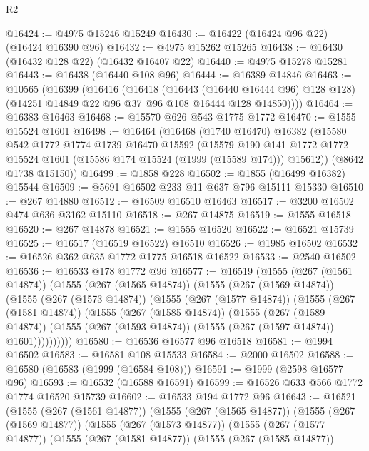 \begin{lexlean}{R2}
\begin{coremodule}
@16424 := @4975 @15246 @15249
@16430 := @16422 (@16424 @96 @22) (@16424 @16390 @96)
@16432 := @4975 @15262 @15265
@16438 := @16430 (@16432 @128 @22) (@16432 @16407 @22)
@16440 := @4975 @15278 @15281
@16443 := @16438 (@16440 @108 @96)
@16444 := @16389 @14846
@16463 := @10565
    (@16399
      (@16416
        (@16418
          (@16443 (@16440 @16444 @96) @128 @128)
          (@14251 @14849 @22 @96 @37 @96 @108 @16444 @128 @14850))))
@16464 := @16383 @16463
@16468 := @15570 @626 @543 @1775 @1772
@16470 := @1555 @15524 @1601
@16498 := @16464
    (@16468
      (@1740 @16470)
      @16382
      (@15580
        @542
        @1772
        @1774
        @1739
        @16470
        @15592
        (@15579
          @190
          @141
          @1772
          @1772
          @15524
          @1601
          (@15586 @174 @15524 (@1999 (@15589 @174)))
          @15612))
      (@8642 @1738 @15150))
@16499 := @1858 @228
@16502 := @1855 (@16499 @16382) @15544
@16509 := @5691 @16502 @233 @11 @637 @796 @15111 @15330
@16510 := @267 @14880
@16512 := @16509 @16510 @16463
@16517 := @3200 @16502 @474 @636 @3162 @15110
@16518 := @267 @14875
@16519 := @1555 @16518
@16520 := @267 @14878
@16521 := @1555 @16520
@16522 := @16521 @15739
@16525 := @16517 (@16519 @16522) @16510
@16526 := @1985 @16502
@16532 := @16526 @362 @635 @1772 @1775 @16518 @16522
@16533 := @2540 @16502
@16536 := @16533 @178 @1772 @96
@16577 := @16519
    (@1555
      (@267 (@1561 @14874))
      (@1555
        (@267 (@1565 @14874))
        (@1555
          (@267 (@1569 @14874))
          (@1555
            (@267 (@1573 @14874))
            (@1555
              (@267 (@1577 @14874))
              (@1555
                (@267 (@1581 @14874))
                (@1555
                  (@267 (@1585 @14874))
                  (@1555
                    (@267 (@1589 @14874))
                    (@1555 (@267 (@1593 @14874)) (@1555 (@267 (@1597 @14874)) @1601))))))))))
@16580 := @16536 @16577 @96 @16518
@16581 := @1994 @16502
@16583 := @16581 @108 @15533
@16584 := @2000 @16502
@16588 := @16580 (@16583 (@1999 (@16584 @108)))
@16591 := @1999 (@2598 @16577 @96)
@16593 := @16532 (@16588 @16591)
@16599 := @16526 @633 @566 @1772 @1774 @16520 @15739
@16602 := @16533 @194 @1772 @96
@16643 := @16521
    (@1555
      (@267 (@1561 @14877))
      (@1555
        (@267 (@1565 @14877))
        (@1555
          (@267 (@1569 @14877))
          (@1555
            (@267 (@1573 @14877))
            (@1555
              (@267 (@1577 @14877))
              (@1555
                (@267 (@1581 @14877))
                (@1555
                  (@267 (@1585 @14877))

\end{coremodule}
\end{lexlean}
